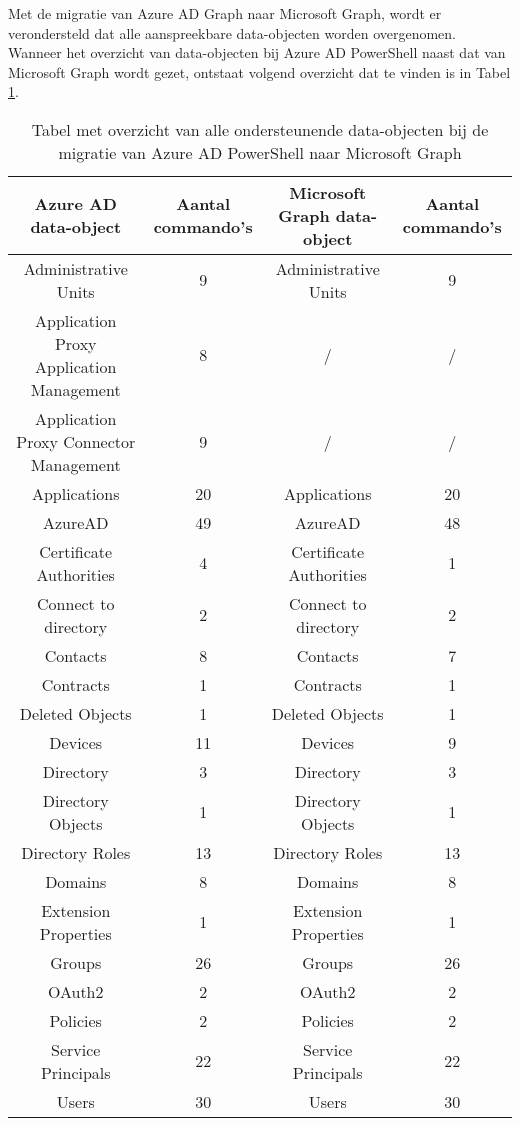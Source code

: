 

Met de migratie van Azure \ac{AD} Graph naar Microsoft Graph, wordt er verondersteld dat alle aanspreekbare data-objecten worden overgenomen. Wanneer het overzicht van data-objecten bij Azure \ac{AD} PowerShell naast dat van Microsoft Graph wordt gezet, ontstaat volgend overzicht dat te vinden is in Tabel \ref{AADMSG}. \\

\begin{table}
    \tiny
    \centering
    \begin{tabular}{ |c|c||c|c| } 
        \hline
        \textbf{Azure AD data-object} & \textbf{Aantal commando's} & \textbf{Microsoft Graph data-object} & \textbf{Aantal commando's} \\
        \hline
        Administrative Units & 9 & Administrative Units & 9 \\ 
        Application Proxy Application Management & 8 & / & / \\
        Application Proxy Connector Management & 9 & / & / \\
        Applications & 20 & Applications & 20 \\ 
        AzureAD & 49 & AzureAD & 48 \\ 
        Certificate Authorities & 4 & Certificate Authorities & 1 \\ 
        Connect to directory & 2 & Connect to directory & 2 \\ 
        Contacts & 8 & Contacts & 7 \\ 
        Contracts & 1 & Contracts & 1 \\ 
        Deleted Objects & 1 & Deleted Objects & 1 \\ 
        Devices & 11 & Devices & 9 \\    
        Directory & 3 & Directory & 3 \\
        Directory Objects & 1 & Directory Objects & 1 \\ 
        Directory Roles & 13 & Directory Roles & 13 \\ 
        Domains & 8 & Domains & 8 \\ 
        Extension Properties & 1 & Extension Properties & 1 \\ 
        Groups & 26 & Groups & 26 \\ 
        OAuth2 & 2 & OAuth2 & 2 \\ 
        Policies & 2 & Policies & 2 \\ 
        Service Principals & 22 & Service Principals & 22 \\ 
        Users & 30 & Users & 30 \\ 
        \hline
    \end{tabular}
    \caption[Tabel migratie Azure AD data-objecten naar Microsoft Graph]{Tabel met overzicht van alle ondersteunende data-objecten bij de migratie van Azure \ac{AD} PowerShell naar Microsoft Graph}
    \label{AADMSG}
\end{table}

